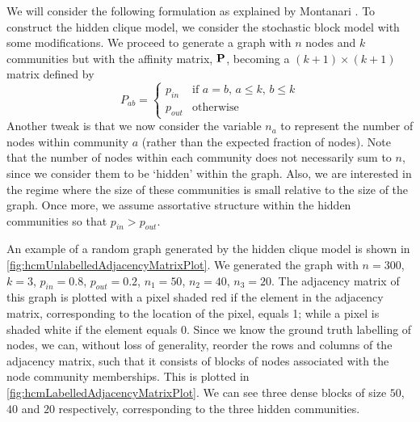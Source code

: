 We will consider the following formulation as explained by Montanari \cite{DM13,Mon13}.
To construct the hidden clique model, we consider the stochastic block model with some modifications.
We proceed to generate a graph with $n$ nodes and $k$ communities but with the affinity matrix, $\mathbf P$, becoming a $(k+1) \times (k+1)$ matrix defined by
\begin{equation}
	\label{def:hcmAffinityMatrix}
	P_{ab} =
	\begin{cases}
		p_{in} & \text{if } a = b \text{, } a \leq k \text{, } b \leq k\\
		p_{out} & \text{otherwise}
	\end{cases}
\end{equation}
Another tweak is that we now consider the variable $n_{a}$ to represent the number of nodes within community $a$ (rather than the expected fraction of nodes). Note that the number of nodes within each community does not necessarily sum to $n$, since we consider them to be `hidden' within the graph.
Also, we are interested in the regime where the size of these communities is small relative to the size of the graph.
Once more, we assume assortative structure within the hidden communities so that $p_{in} > p_{out}$.

An example of a random graph generated by the hidden clique model is shown in \cref{fig:hcmUnlabelledAdjacencyMatrixPlot}.
We generated the graph with $n = 300$, $k = 3$, $p_{in} = 0.8$, $p_{out} = 0.2$, $n_{1} = 50$, $n_{2} = 40$, $n_{3} = 20$.
The adjacency matrix of this graph is plotted with a pixel shaded red if the element in the adjacency matrix, corresponding to the location of the pixel, equals 1; while a pixel is shaded white if the element equals 0.
Since we know the ground truth labelling of nodes, we can, without loss of generality, reorder the rows and columns of the adjacency matrix, such that it consists of blocks of nodes associated with the node community memberships.
This is plotted in \cref{fig:hcmLabelledAdjacencyMatrixPlot}. We can see three dense blocks of size $50$, $40$ and $20$ respectively, corresponding to the three hidden communities.

